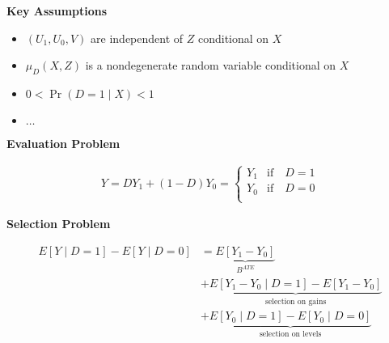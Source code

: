 \begin{frame}\textbf{Key Assumptions}\vspace{0.3cm}

\begin{itemize}\setlength\itemsep{1em}
\item $(U_1, U_0, V)$ are independent of $Z$ conditional on $X$
\item $\mu_D(X, Z)$ is a nondegenerate random variable conditional on $X$
\item $0 < \Pr(D=1 \mid X) < 1$
\item $\hdots$
\end{itemize}
\end{frame}
\begin{frame}\textbf{Evaluation Problem}\vspace{0.3cm}

\begin{align*}
Y = D Y_1 + (1 - D)Y_0 =
\begin{cases}
Y_{1} & \text{if}\quad D = 1 \\
Y_{0} & \text{if}\quad D = 0 \\
\end{cases}
\end{align*}\end{frame}
\begin{frame}\textbf{Selection Problem}\vspace{0.3cm}

\begin{align*}
E[Y\mid D = 1] - E[Y\mid D = 0] & = \underbrace{E[Y_1 - Y_0]}_{B^{ATE}} \\
	 							& + \underbrace{E[Y_1 - Y_0 \mid D = 1] - E[Y_1 - Y_0]}_{\text{selection on gains}} \\
								& + \underbrace{E[Y_0\mid D = 1] - E[Y_0 \mid D = 0]}_{\text{selection on levels}}
\end{align*}
\end{frame}
